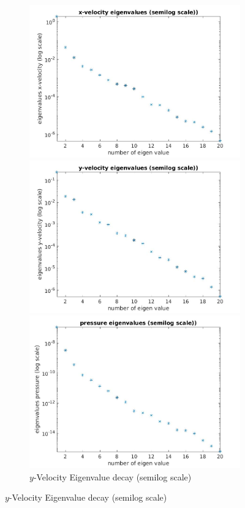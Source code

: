 \documentclass[a4paper,oneside,openright,spanish,english]{book}
\begin{document}
\begin{figure}
\begin{subfigure}{\textwidth}	
  \includegraphics[width=\linewidth,height=0.3\textheight]{x_velocity_eigen_value_semilog.jpg}
  \caption{$x$-Velocity Eigenvalue decay (semilog scale)} 
  \label{eigen_value_decay_x_velocity_semilog}
  \includegraphics[width=\linewidth,height=0.3\textheight]{y_velocity_eigen_value_semilog.jpg}
  \caption{$y$-Velocity Eigenvalue decay (semilog scale)} 
  \label{eigen_value_decay_y_velocity_semilog}
  \includegraphics[width=\linewidth,height=0.3\textheight]{pressure_eigen_value_semilog.jpg}

\end{subfigure}
\end{figure}
\end{document}
